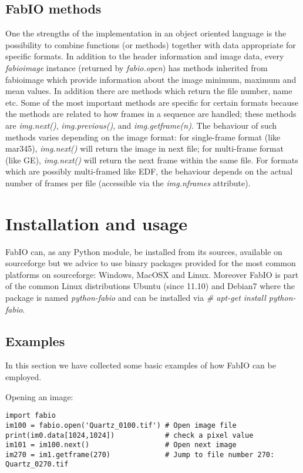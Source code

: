 \documentclass[preprint]{iucr}
\begin{document}
\subsection{FabIO methods}

One the strengths of the implementation in an object oriented language
is the possibility to combine functions (or methods) together with data
appropriate for specific formats.
In addition to the header information and image data, every {\em fabioimage}
instance (returned by {\em fabio.open}) has methods inherited from fabioimage 
which provide information about the image minimum, maximum and mean values.
In addition there are methods which return the file number, name etc. 
Some of the most important methods are specific for certain formats because 
the methods are related to how frames in a sequence are handled; these methods
are {\em img.next()}, {\em img.previous()}, and {\em img.getframe(n)}.
The behaviour of such methods varies depending on the
image format: for single-frame format (like mar345), {\em img.next()} will
return the image in next file; for multi-frame format (like GE), {\em
img.next()} will return the next frame within the same file. For formats which are possibly 
multi-framed like EDF, the behaviour depends on the actual number of frames per
file (accessible via the {\em img.nframes} attribute).


\section{Installation and usage}

FabIO can, as any Python module, be installed from its sources, available on 
sourceforge \cite{fabio} but we advice to use binary packages provided for the
most common platforms on sourceforge: Windows, MacOSX and Linux.
Moreover FabIO is part of the common Linux distributions Ubuntu (since 11.10)
and Debian7 where the package is named {\em python-fabio} and can be installed
via {\em \# apt-get install python-fabio}. 

\subsection{Examples}

In this section we have collected some basic examples of how FabIO can be employed. 

Opening an image:\\
\begin{verbatim}
import fabio     
im100 = fabio.open('Quartz_0100.tif') # Open image file
print(im0.data[1024,1024])            # check a pixel value
im101 = im100.next()                  # Open next image
im270 = im1.getframe(270)             # Jump to file number 270: Quartz_0270.tif
\end{verbatim}
\end{document}
